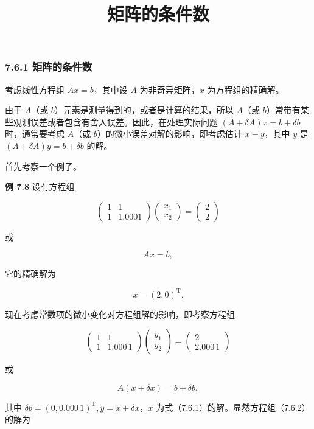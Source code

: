 \documentclass[
  10pt,
  fontset=fandol]{ctexart}
\title{矩阵的条件数}
\author{}
\date{}
\begin{document}
\maketitle

\subsubsection{7.6.1 矩阵的条件数}\label{ux77e9ux9635ux7684ux6761ux4ef6ux6570}

考虑线性方程组 \(Ax=b\)，其中设 \(A\) 为非奇异矩阵，\(x\) 为方程组的精确解。

由于 \(A\)（或 \(b\)）元素是测量得到的，或者是计算的结果，所以 \(A\)（或 \(b\)）常带有某些观测误差或者包含有舍入误差。因此，在处理实际问题 \((A+\delta A)x=b+\delta b\) 时，通常要考虑 \(A\)（或 \(b\)）的微小误差对解的影响，即考虑估计 \(x-y\)，其中 \(y\) 是 \((A+\delta A)y=b+\delta b\) 的解。

首先考察一个例子。

\textbf{例 7.8} 设有方程组

\[
\begin{pmatrix}1&1\\1&1.0001\end{pmatrix}
\begin{pmatrix}x_1\\x_2\end{pmatrix}
=\begin{pmatrix}2\\2\end{pmatrix}
\]

或

\[
Ax=b,
\tag{7.6.1}
\]

它的精确解为

\[
x=(2,0)^{\mathrm T}.
\]

现在考虑常数项的微小变化对方程组解的影响，即考察方程组

\[
\begin{pmatrix}1&1\\1&1.000\,1\end{pmatrix}
\begin{pmatrix}y_1\\y_2\end{pmatrix}
=\begin{pmatrix}2\\2.000\,1\end{pmatrix}
\]

或

\[
A(x+\delta x)=b+\delta b,
\tag{7.6.2}
\]

其中 \(\delta b=(0,0.000\,1)^{\mathrm T},y=x+\delta x\)，\(x\) 为式（7.6.1）的解。显然方程组（7.6.2）的解为
\end{document}

